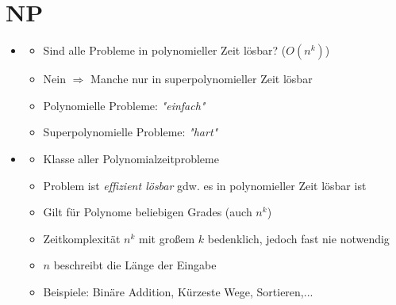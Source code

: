 \documentclass[
    12pt,
    a4paper,
    ngerman,
    color=3b,%
    marginpar=false,
    colorback=false,
    leqno,
]{tudaexercise}
\begin{document}
\section{NP}
\begin{itemize}
    \item {}
          \begin{itemize}
              \item Sind alle Probleme in polynomieller Zeit lösbar? ($O(n^k)$)
              \item Nein $\Rightarrow$ Manche nur in superpolynomieller Zeit lösbar
              \item Polynomielle Probleme: \textit{\string"einfach\string"}
              \item Superpolynomielle Probleme: \textit{\string"hart\string"}
          \end{itemize}

    \item {}
          \begin{itemize}
              \item Klasse aller Polynomialzeitprobleme
              \item Problem ist \textit{effizient lösbar} gdw. es in polynomieller Zeit lösbar ist
              \item Gilt für Polynome beliebigen Grades (auch $n^k$)
              \item Zeitkomplexität $n^k$ mit gro\ss em $k$ bedenklich, jedoch fast nie notwendig
              \item $n$ beschreibt die Länge der Eingabe
              \item Beispiele: Binäre Addition, Kürzeste Wege, Sortieren,...
          \end{itemize}


\end{itemize}
\end{document}
